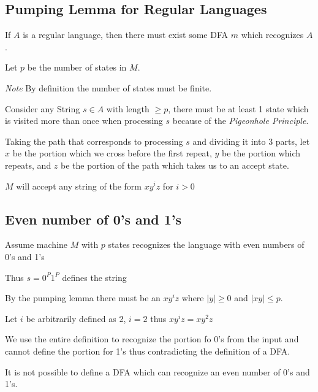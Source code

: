 \documentclass[12pt,letterpaper, twocolumn]{article}
\begin{document}
\subsection{Pumping Lemma for Regular Languages}

If $A$ is a regular language, then there must exist some DFA $m$ which recognizes $A$. 

Let $p$ be the number of states in $M$. 

\textit{Note} By definition the number of states must be finite. 

Consider any String $s \in A$ with length $\ge p$, there must be at least 1 state which is visited more than once when processing $s$ because of the \textit{Pigeonhole Principle}. 

Taking the path that corresponds to processing $s$ and dividing it into 3 parts, let $x$ be the portion which we cross before the first repeat, $y$ be the portion which repeats, and $z$ be the portion of the path which takes us to an accept state. 

$M$ will accept any string of the form $x{y^i}z$ for $i>0$

\subsection{Even number of 0's and 1's}
Assume machine $M$ with $p$ states recognizes the language with even numbers of 0's and 1's

Thus $s=0^P1^P$ defines the string

By the pumping lemma there must be an $x{y^i}z$ where $|y|\ge0$ and $|xy|\le p$. 

Let $i$ be arbitrarily defined as 2, $i=2$ thus $x{y^i}z=xy^2z$

We use the entire definition to recognize the portion fo 0's from the input and cannot define the portion for 1's thus contradicting the definition of a DFA. 

It is not possible to define a DFA which can recognize an even number of 0's and 1's. 
\end{document}
